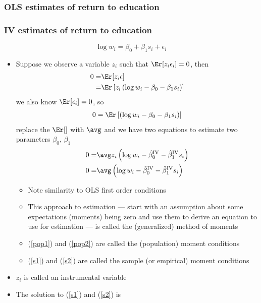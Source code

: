 \begin{frame} 
  \frametitle{OLS estimates of return to education}  
   
\end{frame}

\begin{frame}[allowframebreaks]
  \frametitle{IV estimates of return to education}
  \[ \log w_i = \beta_0 + \beta_1 s_i + \epsilon_i \]
  \begin{itemize}
  \item Suppose we observe a variable $z_i$ such that $\Er[z_i
    \epsilon_i] = 0$, then 
    \begin{align}
      0 = & \Er[z_i \epsilon] \notag \\
      = & \Er\left[z_i \left(\log w_i - \beta_0 - \beta_1 s_i \right)
      \right]  \label{pop1}
    \end{align}
    we also know $\Er[\epsilon_i] = 0$, so
    \begin{align} 
      0 = \Er\left[ \left(\log w_i - \beta_0 - \beta_1 s_i \right)
      \right]  \label{pop2}
    \end{align}
    replace the $\Er[]$ with $\avg$ and we have two equations to
    estimate two parameters $\beta_0$, $\beta_1$
    \begin{align}
      0 = & \avg z_i \left(\log w_i - \biv_0 - \biv_1 s_i
      \right) \label{s1} \\
      0 = & \avg \left(\log w_i - \biv_0 - \biv_1 s_i \right) \label{s2}
    \end{align}
    \begin{itemize}
    \item Note similarity to OLS first order conditions 
    \item This approach to estimation --- start with an assumption
      about some expectations (moments) being zero and use them to derive an
      equation to use for estimation --- is called the (generalized)
      method of moments
    \item (\ref{pop1}) and (\ref{pop2}) are called the (population)
      moment conditions
    \item (\ref{s1}) and (\ref{s2}) are called the sample (or
      empirical) moment conditions 
    \end{itemize}
  \item $z_i$ is called an \alert{instrumental variable}
  \item The solution to (\ref{s1}) and (\ref{s2}) is

\end{itemize}
\end{frame}
